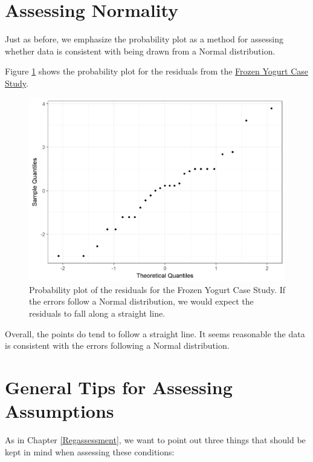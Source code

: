 \documentclass[]{book}
\theoremstyle{plain}
\theoremstyle{mydefn}
\theoremstyle{myexmpl}
\theoremstyle{remark}
\begin{document}
\section{Assessing Normality}\label{assessing-normality-2}

Just as before, we emphasize the probability plot as a method for
assessing whether data is consistent with being drawn from a Normal
distribution.

Figure \ref{fig:blockassessment-normal-yogurt} shows the probability
plot for the residuals from the \protect\hyperlink{CaseYogurt}{Frozen
Yogurt Case Study}.

\begin{figure}

{\centering \includegraphics[width=0.8\linewidth]{./Images/blockassessment-normal-yogurt-1} 

}

\caption{Probability plot of the residuals for the Frozen Yogurt Case Study.  If the errors follow a Normal distribution, we would expect the residuals to fall along a straight line.}\label{fig:blockassessment-normal-yogurt}
\end{figure}

Overall, the points do tend to follow a straight line. It seems
reasonable the data is consistent with the errors following a Normal
distribution.

\section{General Tips for Assessing
Assumptions}\label{general-tips-for-assessing-assumptions-2}

As in Chapter \ref{Regassessment}, we want to point out three things
that should be kept in mind when assessing these conditions:
\end{document}
